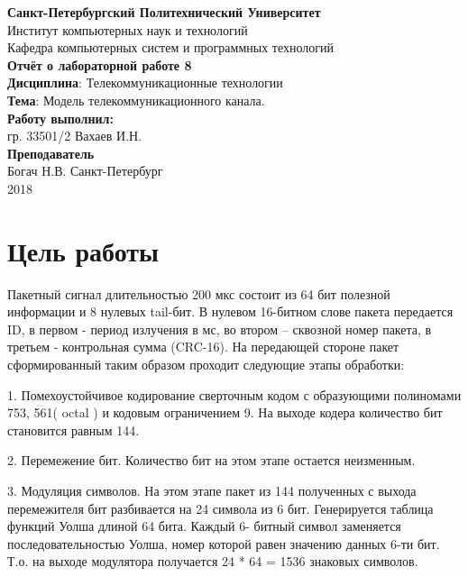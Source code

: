 \documentclass[a4paper,14pt]{extarticle}
\begin{document}
\begin{titlepage}
\centering 
{\bfseries Санкт-Петербургский Политехнический Университет} \\
Институт компьютерных наук и технологий \\
Кафедра компьютерных систем и программных технологий \\
\vspace{5cm}
{\centering \textbf{Отчёт о лабораторной работе 8} \\ 
\vspace{0.2cm}
\textbf{Дисциплина}: Телекоммуникационные технологии \\
\vspace{0.2cm}
\textbf{Тема}: Модель телекоммуникационного канала. } \\
\vspace{4cm}
\hfill {\bfseries Работу выполнил:}  \\
\hfill гр. 33501/2 Вахаев И.Н. \\
\hfill {\bfseries Преподаватель}  \\
\hfill Богач Н.В.
\vfill
Санкт-Петербург \\
{\large 2018}
\end{titlepage}

\section{Цель работы}
Пакетный сигнал длительностью 200 мкс состоит из 64 бит полезной информации и 8 нулевых tail-бит. В нулевом 16-битном слове пакета передается ID, в первом - период излучения в мс, во втором – сквозной номер пакета, в третьем - контрольная сумма (CRC-16). На передающей стороне пакет сформированный таким образом проходит следующие этапы обработки: 

1. Помехоустойчивое кодирование сверточным кодом с образующими полиномами 753, 561( octal ) и кодовым ограничением 9. На выходе кодера количество бит становится равным 144. 

2. Перемежение бит. Количество бит на этом этапе остается неизменным. 

3. Модуляция символов. На этом этапе пакет из 144 полученных с выхода перемежителя бит разбивается на 24 символа из 6 бит. Генерируется таблица функций Уолша длиной 64 бита. Каждый 6- битный символ заменяется последовательностью Уолша, номер которой равен значению данных 6-ти бит. Т.о. на выходе модулятора получается 24 * 64 = 1536 знаковых символов. 
\end{document}
